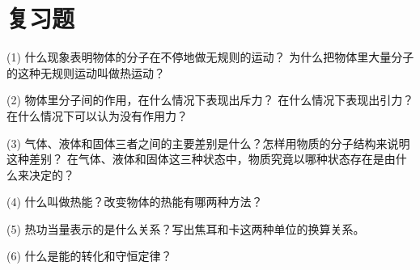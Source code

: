 \section*{复习题}

(1) 什么现象表明物体的分子在不停地做无规则的运动？
为什么把物体里大量分子的这种无规则运动叫做热运动？

(2) 物体里分子间的作用，在什么情况下表现出斥力？
在什么情况下表现出引力？在什么情况下可以认为没有作用力？

(3) 气体、液体和固体三者之间的主要差别是什么？怎样用物质的分子结构来说明这种差别？
在气体、液体和固体这三种状态中，物质究竟以哪种状态存在是由什么来决定的？

(4) 什么叫做热能？改变物体的热能有哪两种方法？

(5) 热功当量表示的是什么关系？写出焦耳和卡这两种单位的换算关系。

(6) 什么是能的转化和守恒定律？

